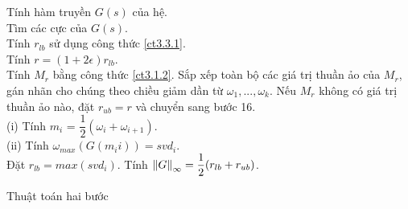 \begin{algorithm}[H]
\SetAlgoLined
{}
Tính hàm truyền $G(s)$ của hệ.\\
Tìm các cực của $G(s)$.\\
    Tính $r_{lb}$ sử dụng công thức \eqref{ct3.3.1}.\\
    Tính $r = (1 + 2\epsilon)r_{lb}$.\\
    Tính $M_r$ bằng công thức \eqref{ct3.1.2}.
    Sắp xếp toàn bộ các giá trị thuần ảo của $M_r$, gán nhãn cho chúng theo chiều giảm dần từ $\omega_1, ... ,\omega_k.$
    Nếu $M_r$ không có giá trị thuần ảo nào, đặt $r_{ub} = r$ và chuyển sang bước 16.\\
     {
    (i) Tính $m_i$ = $\dfrac{1}{2}(\omega_i + \omega_{i+1})$.\\
    (ii) Tính $\omega_{max}(G(m_ii)) = svd_i$.\\
    Đặt $r_{lb} = max(svd_i)$.
    }
     Tính $\norm{G}_\infty = \dfrac{1}{2}(r_{lb} + r_{ub})$.
 \caption{Thuật toán hai bước}
\end{algorithm}

